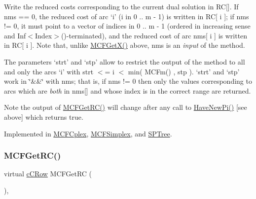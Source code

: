 Write the reduced costs corresponding to the current dual solution in RC\mbox{[}\mbox{]}. If nms == 0, the reduced cost of arc `i' (i in 0 .. m -\/ 1) is written in RC\mbox{[} i \mbox{]}; if nms != 0, it must point to a vector of indices in 0 .. m -\/ 1 (ordered in increasing sense and Inf$<$\+Index$>$()-\/terminated), and the reduced cost of arc nms\mbox{[} i \mbox{]} is written in RC\mbox{[} i \mbox{]}. Note that, unlike \mbox{\hyperlink{class_m_c_f_class_a4eb307e0707adaef99bb0e08c9e10eb8}{M\+C\+F\+Get\+X()}} above, nms is an {\itshape input} of the method.

The parameters `strt' and `stp' allow to restrict the output of the method to all and only the arcs `i' with strt $<$= i $<$ min( M\+C\+Fm() , stp ). `strt' and `stp' work in \char`\"{}\&\&\char`\"{} with nms; that is, if nms != 0 then only the values corresponding to arcs which are {\itshape both} in nms\mbox{[}\mbox{]} and whose index is in the correct range are returned.

\begin{DoxyNote}{Note}
the output of \mbox{\hyperlink{class_m_c_f_class_af027cee8179a876a4879c73820c380d1}{M\+C\+F\+Get\+R\+C()}} will change after any call to \mbox{\hyperlink{class_m_c_f_class_a87b2b6516a7874ac55145312bd2d55bb}{Have\+New\+Pi()}} \mbox{[}see above\mbox{]} which returns true. 
\end{DoxyNote}


Implemented in \mbox{\hyperlink{class_m_c_f_cplex_a9cc0f8dbc79bf2fd7744a6ad32b3e985}{M\+C\+F\+Cplex}}, \mbox{\hyperlink{class_m_c_f_simplex_a9cc0f8dbc79bf2fd7744a6ad32b3e985}{M\+C\+F\+Simplex}}, and \mbox{\hyperlink{class_s_p_tree_aa7cb14464eba4814fef17efc9871b1de}{S\+P\+Tree}}.

\mbox{\label{class_m_c_f_class_af027cee8179a876a4879c73820c380d1}} 
\subsubsection{\texorpdfstring{M\+C\+F\+Get\+R\+C()}{MCFGetRC()}\hspace{0.1cm}{\footnotesize\ttfamily [2/3]}}
{\footnotesize\ttfamily virtual \mbox{\hyperlink{class_m_c_f_class_ab700102e9ba8bb6015be6818d4e99097}{c\+C\+Row}} M\+C\+F\+Get\+RC (\begin{DoxyParamCaption}\item[{void}]{ }\end{DoxyParamCaption})\hspace{0.3cm}{\ttfamily [inline]}, {\ttfamily [virtual]}}

